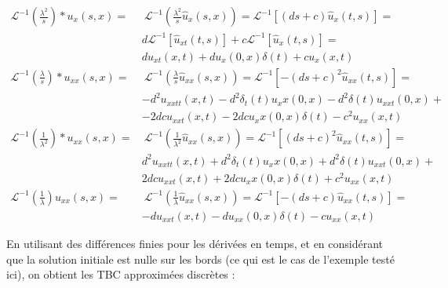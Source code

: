 \begin{equation*}
	\begin{aligned}
    \mathcal{L}^{-1} \left( \frac{\lambda^2}{s}\right) *  u_x(s,x)   =  & \  \mathcal{L}^{-1} \left( \frac{\lambda^2}{s} \hat{u}_x(s,x) \right) =  \mathcal{L}^{-1} \left[ (ds+c) \hat{u}_x(t,s) \right] = \\
    			 & d\mathcal{L}^{-1} \left[ \hat{u}_{xt}(t,s) \right] + c \mathcal{L}^{-1} \left[ \hat{u}_{x}(t,s) \right] = \\
    			 &   du_{xt}(x,t) + du_x(0,x)\delta (t) + cu_x(x,t) \\
    \mathcal{L}^{-1} \left( \frac{\lambda}{s} \right) * u_{xx}(s,x)  = & \   \mathcal{L}^{-1} \left( \frac{\lambda}{s} \hat{u}_{xx}(s,x) \right) =  \mathcal{L}^{-1} \left[ -(ds+c)^2 \hat{u}_{xx}(t,s) \right] =\\
    			&  -d^2u_{xxtt}(x,t) - d^2\delta_t(t) u_xx(0,x) - d^2 \delta(t)u_{xxt}(0,x)  + \\ 
    			& - 2dcu_{xxt}(x,t) -  2dcu_xx(0,x)\delta (t) - c^2u_{xx}(x,t) \\
     \mathcal{L}^{-1} \left( \frac{1}{\lambda^2} \right) * u_{xx}(s,x)  = & \  \mathcal{L}^{-1} \left( \frac{1}{\lambda^2} \hat{u}_{xx}(s,x) \right) = \mathcal{L}^{-1} \left[ (ds+c)^2 \hat{u}_{xx}(t,s) \right] = \\
    			& d^2u_{xxtt}(x,t) + d^2\delta_t(t) u_xx(0,x) + d^2 \delta(t)u_{xxt}(0,x)  + \\
    			& 2dcu_{xxt}(x,t) +  2dcu_xx(0,x)\delta (t) + c^2u_{xx}(x,t) \\
     \mathcal{L}^{-1} \left( \frac{1}{\lambda} \right) u_{xx}(s,x) = & \  \mathcal{L}^{-1} \left( \frac{1}{\lambda} \hat{u}_{xx}(s,x) \right) = \mathcal{L}^{-1} \left[ -(ds+c) \hat{u}_{xx}(t,s) \right] = \\
    			& -du_{xxt}(x,t) - du_{xx}(0,x)\delta (t) - cu_{xx}(x,t)
\end{aligned}
\end{equation*}

\indent En utilisant des différences finies pour les dérivées en temps, et en considérant que la solution initiale est nulle sur les bords (ce qui est le cas de l'exemple testé ici), on obtient les TBC approximées discrètes : 


